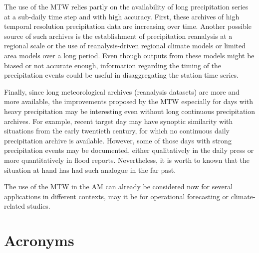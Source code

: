 \documentclass[hess, manuscript]{copernicus}
\begin{document}
	The use of the MTW relies partly on the availability of long precipitation series at a sub-daily time step and with high accuracy. First, these archives of high temporal resolution precipitation data are increasing over time. Another possible source of such archives is the establishment of precipitation reanalysis at a regional scale or the use of reanalysis-driven regional climate models or limited area models over a long period. Even though outputs from these models might be biased or not accurate enough, information regarding the timing of the precipitation events could be useful in disaggregating the station time series.
	
	Finally, since long meteorological archives (reanalysis datasets) are more and more available, the improvements proposed by the MTW especially for days with heavy precipitation may be interesting even without long continuous precipitation archives. For example, recent target day may have synoptic similarity with situations from the early twentieth century, for which no continuous daily precipitation archive is available. However, some of those days with strong precipitation events may be documented, either qualitatively in the daily press or more quantitatively in flood reports. Nevertheless, it is worth to known that the situation at hand has had such analogue in the far past.
	
	The use of the MTW in the AM can already be considered now for several applications in different contexts, may it be for operational forecasting or climate-related studies.
	
	
	\appendix
	\section{Acronyms}    %
	
\end{document}
